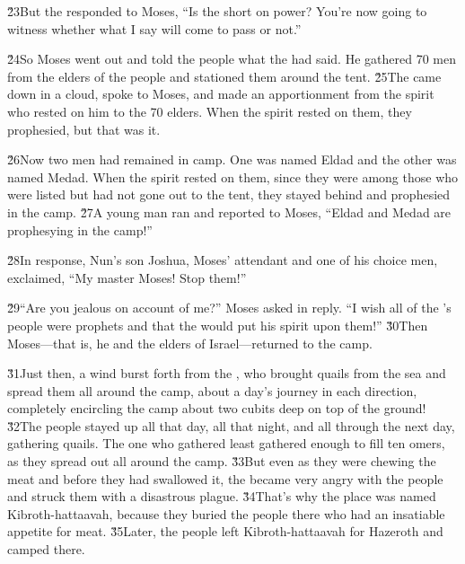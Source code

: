 \v{23}But the  responded to Moses, ``Is the  short on power? You're now going to witness whether what I say will come to pass or not.''

\v{24}So Moses went out and told the people what the  had said. He gathered 70 men from the elders of the people and stationed them around the tent. \v{25}The  came down in a cloud, spoke to Moses, and made an apportionment from the spirit who rested on him to the 70 elders. When the spirit rested on them, they prophesied, but that was it.

\v{26}Now two men had remained in camp. One was named Eldad and the other was named Medad. When the spirit rested on them, since they were among those who were listed but had not gone out to the tent, they stayed behind and prophesied in the camp. \v{27}A young man ran and reported to Moses, ``Eldad and Medad are prophesying in the camp!''

\v{28}In response, Nun's son Joshua, Moses' attendant and one of his choice men, exclaimed, ``My master Moses! Stop them!''

\v{29}``Are you jealous on account of me?'' Moses asked in reply. ``I wish all of the 's people were prophets and that the  would put his spirit upon them!'' \v{30}Then Moses---that is, he and the elders of Israel---returned to the camp.

\v{31}Just then, a wind burst forth from the , who brought quails from the sea and spread them all around the camp, about a day's journey in each direction, completely encircling the camp about two cubits deep on top of the ground! \v{32}The people stayed up all that day, all that night, and all through the next day, gathering quails. The one who gathered least gathered enough to fill ten omers, as they spread out all around the camp. \v{33}But even as they were chewing the meat and before they had swallowed it, the  became very angry with the people and struck them with a disastrous plague. \v{34}That's why the place was named Kibroth-hattaavah, because they buried the people there who had an insatiable appetite for meat. \v{35}Later, the people left Kibroth-hattaavah for Hazeroth and camped there.

